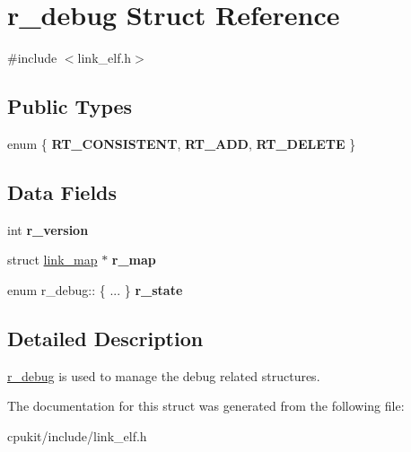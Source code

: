\hypertarget{structr__debug}{}\section{r\+\_\+debug Struct Reference}
\label{structr__debug}


{\ttfamily \#include $<$link\+\_\+elf.\+h$>$}

\subsection*{Public Types}
\begin{DoxyCompactItemize}
\item 
\mbox{\label{structr__debug_aa630e91b37e56e54b0a2089266ad6ae1}} 
enum \{ {\bfseries R\+T\+\_\+\+C\+O\+N\+S\+I\+S\+T\+E\+NT}, 
{\bfseries R\+T\+\_\+\+A\+DD}, 
{\bfseries R\+T\+\_\+\+D\+E\+L\+E\+TE}
 \}
\end{DoxyCompactItemize}
\subsection*{Data Fields}
\begin{DoxyCompactItemize}
\item 
\mbox{\label{structr__debug_afed2e228a703cd73303033bbb4526005}} 
int {\bfseries r\+\_\+version}
\item 
\mbox{\label{structr__debug_aa01ec1430c517626ac8315cad150a356}} 
struct \mbox{\hyperlink{structlink__map}{link\+\_\+map}} $\ast$ {\bfseries r\+\_\+map}
\item 
\mbox{\label{structr__debug_a7ab42d2cd287f340f4b55554a9e29296}} 
enum r\+\_\+debug\+:: \{ ... \}  {\bfseries r\+\_\+state}
\end{DoxyCompactItemize}


\subsection{Detailed Description}
\mbox{\hyperlink{structr__debug}{r\+\_\+debug}} is used to manage the debug related structures. 

The documentation for this struct was generated from the following file\+:\begin{DoxyCompactItemize}
\item 
cpukit/include/link\+\_\+elf.\+h\end{DoxyCompactItemize}
